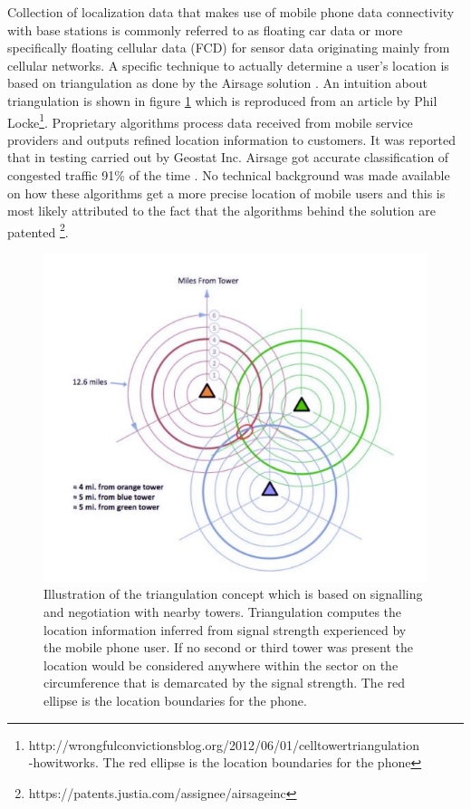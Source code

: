 \documentclass[12pt, a4paper]{report}
\theoremstyle{definition}
\theoremstyle{definition}%
\theoremstyle{definition}%
\theoremstyle{definition}%
\theoremstyle{definition}%
\theoremstyle{definition}%
\begin{document}
Collection of localization data that makes use of mobile phone data connectivity with base stations is commonly referred to as floating car data or more specifically floating cellular data (FCD) for sensor data originating mainly from cellular networks. A specific technique to actually determine a user's location is based on triangulation as done by the Airsage solution \cite{Hoteit2014}. An intuition about triangulation is shown in figure \ref{fig:triangulation} which is reproduced from an article by Phil Locke\footnote{http://wrongfulconvictionsblog.org/2012/06/01/cell\-tower\-triangulation\\-how\-it\-works. The red ellipse is the location boundaries for the phone}. Proprietary algorithms process data received from mobile service providers and outputs refined location information to customers. It was reported that in testing carried out by Geostat Inc. Airsage got accurate classification of congested traffic 91\% of the time  \cite{Wang2012}. No technical background was made available on how these algorithms get a more precise location of mobile users and this is most likely attributed to the fact that the algorithms behind the solution are patented \footnote{https://patents.justia.com/assignee/airsage\-inc}.  

\begin{figure}[!] 
	\includegraphics[scale=0.75]{triangulation.jpg}
	\centering
	\caption[Triangulation concept]{
		Illustration of the triangulation concept which is based on signalling and negotiation with nearby towers. Triangulation computes the location information inferred from signal strength experienced by the mobile phone user. If no second or third tower was present the location would be considered anywhere within the sector on the circumference that is demarcated by the signal strength. The red ellipse is the location boundaries for the phone.}
	\label{fig:triangulation}
\end{figure}
\end{document}
